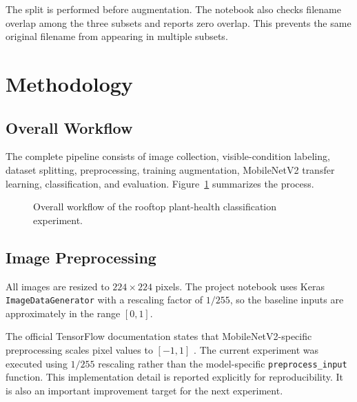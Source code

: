 \documentclass[conference]{IEEEtran}
\begin{document}
The split is performed before augmentation. The notebook also checks filename overlap among the three subsets and reports zero overlap. This prevents the same original filename from appearing in multiple subsets.

\section{Methodology}
\subsection{Overall Workflow}
The complete pipeline consists of image collection, visible-condition labeling, dataset splitting, preprocessing, training augmentation, MobileNetV2 transfer learning, classification, and evaluation. Figure~\ref{fig:workflow} summarizes the process.

\begin{figure}[!t]
\centering
{}
\caption{Overall workflow of the rooftop plant-health classification experiment.}
\label{fig:workflow}
\end{figure}

\subsection{Image Preprocessing}
All images are resized to $224\times224$ pixels. The project notebook uses Keras \texttt{ImageDataGenerator} with a rescaling factor of $1/255$, so the baseline inputs are approximately in the range $[0,1]$.

The official TensorFlow documentation states that MobileNetV2-specific preprocessing scales pixel values to $[-1,1]$ \cite{tensorflow_mobilenetv2}. The current experiment was executed using $1/255$ rescaling rather than the model-specific \texttt{preprocess\_input} function. This implementation detail is reported explicitly for reproducibility. It is also an important improvement target for the next experiment.
\end{document}
